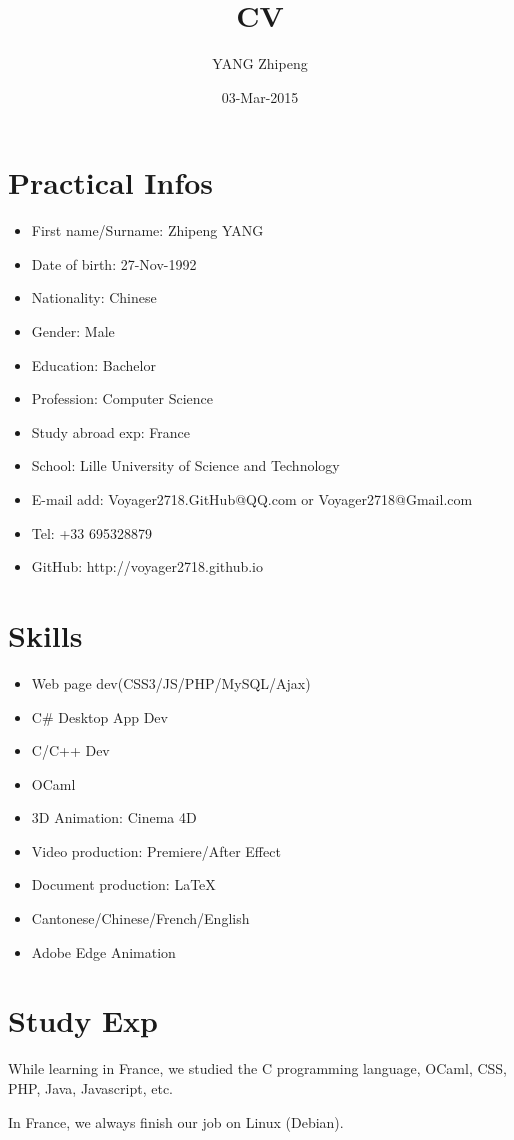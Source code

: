 \documentclass[UTF8]{ctexart}
\title{CV}
\author{YANG Zhipeng}
\date{03-Mar-2015}
\begin{document}
\maketitle
\pagestyle{fancy}
\section{Practical Infos}
\begin{itemize}
\item First name/Surname: Zhipeng YANG
\item Date of birth: 27-Nov-1992
\item Nationality: Chinese
\item Gender: Male
\item Education: Bachelor
\item Profession: Computer Science
\item Study abroad exp: France
\item School: Lille University of Science and Technology
\item E-mail add: Voyager2718.GitHub@QQ.com or Voyager2718@Gmail.com
\item Tel: +33 695328879
\item GitHub: http://voyager2718.github.io
\end{itemize}
\section{Skills}
\begin{itemize}
\item Web page dev(CSS3/JS/PHP/MySQL/Ajax)
\item C\#{} Desktop App Dev
\item C/C++ Dev
\item OCaml
\item 3D Animation: Cinema 4D
\item Video production: Premiere/After Effect
\item Document production: \LaTeX
\item Cantonese/Chinese/French/English
\item Adobe Edge Animation
\end{itemize}
\section{Study Exp}
While learning in France, we studied the C programming language, OCaml, CSS, PHP, Java, Javascript, etc.

In France, we always finish our job on Linux (Debian).
\end{document}
